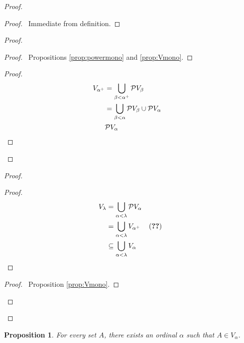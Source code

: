 \documentclass{book}
\let\qed\relax
\newtheorem{prop}[ax]{Proposition}
\theoremstyle{definition}
\begin{document}
\begin{proof}
\pf
{}
\begin{proof}
	\pf\ Immediate from definition.
\end{proof}
\begin{proof}
	\pf
	\begin{proof}
		\pf\ Propositions \ref{prop:powermono} and \ref{prop:Vmono}.
	\end{proof}
	\begin{proof}
	\begin{align*}
		V_{\alpha^+} & = \bigcup_{\beta < \alpha^+} \mathcal{P} V_\beta \\
		& = \bigcup_{\beta < \alpha} \mathcal{P} V_\beta \cup \mathcal{P} V_\alpha \\
		& \mathcal{P} V_\alpha & \qed
	\end{align*}
	\end{proof}
\end{proof}
\begin{proof}
	\pf
	\begin{proof}
	\pf
	\begin{align*}
		V_\lambda & = \bigcup_{\alpha < \lambda} \mathcal{P} V_\alpha \\
		& = \bigcup_{\alpha < \lambda} V_{\alpha^+} & (\text{\stepref{2}}) \\
		& \subseteq \bigcup_{\alpha < \lambda} V_\alpha
	\end{align*}
	\end{proof}
	\begin{proof}
		\pf\ Proposition \ref{prop:Vmono}.
	\end{proof}
\end{proof}
\qed
\end{proof}

\begin{prop}
For every set $A$, there exists an ordinal $\alpha$ such that $A \in V_\alpha$.
\end{prop}
\end{document}
